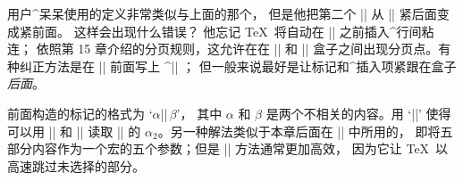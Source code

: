 \ddangerexercise 用户^{呆呆}使用的定义非常类似与上面的那个，
但是他把第二个 |\mark| 从 |\leftline| 紧后面变成紧前面。
这样会出现什么错误？
\answer 他忘记 \TeX\ 将自动在 |\leftline| 之前插入^{行间粘连}；
依照第 15 章介绍的分页规则，这允许在在 |\mark| 和 |\leftline|
盒子之间出现分页点。有种纠正方法是在 |\mark| 前面写上 ^|\nobreak| ；
但一般来说最好是让标记和^{插入项}紧跟在盒子{\sl 后面}。

\ddangerexercise \1前面构造的标记的格式为 `$\alpha$|\else|$\,\beta$'，
其中 $\alpha$ 和 $\beta$ 是两个不相关的内容。用 `|\else|' 使得可以用
|\iftrue| 和 |\iffalse| 来选择 $\alpha$ 或 $\beta$。推广一下：
假定在一个任务中，标记中有五个不相关的内容，并且每个标记的格式为
`$\alpha_0$|\or|$\,\alpha_1$|\or|$\,\alpha_2$|\or|$\,\alpha_3$|\or|$\,\alpha_4$'。
看看怎样从这样的标记中任意选择出某个 $\alpha$。
\answer 比如可以用 |\ifcase2\expandafter\relax\botmark\fi| 读取 |\botmark|
的 $\alpha_2$。另一种解法类似于本章后面在 |\inxcheck| 中所用的，
即将五部分内容作为一个宏的五个参数；但是 |\ifcase| 方法通常更加高效，
因为它让 \TeX\ 以高速跳过未选择的部分。

